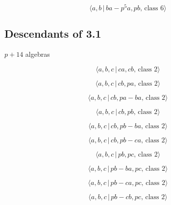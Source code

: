 \documentclass[10pt]{article}
\begin{document}
\begin{equation}
\langle a,b\,|\,ba-p^5a,pb,\,\text{class }6\rangle  \tag{7.659}
\end{equation}

\subsection{Descendants of 3.1}

$p+14$ algebras

\begin{equation}
\langle a,b,c\,|\,ca,cb,\,\text{class }2\rangle  \tag{7.660}
\end{equation}

\begin{equation}
\langle a,b,c\,|\,cb,pa,\,\text{class }2\rangle  \tag{7.661}
\end{equation}

\begin{equation}
\langle a,b,c\,|\,cb,pa-ba,\,\text{class }2\rangle  \tag{7.662}
\end{equation}

\begin{equation}
\langle a,b,c\,|\,cb,pb,\,\text{class }2\rangle  \tag{7.663}
\end{equation}

\begin{equation}
\langle a,b,c\,|\,cb,pb-ba,\,\text{class }2\rangle  \tag{7.664}
\end{equation}

\begin{equation}
\langle a,b,c\,|\,cb,pb-ca,\,\text{class }2\rangle  \tag{7.665}
\end{equation}

\begin{equation}
\langle a,b,c\,|\,pb,pc,\,\text{class }2\rangle  \tag{7.666}
\end{equation}

\begin{equation}
\langle a,b,c\,|\,pb-ba,pc,\,\text{class }2\rangle  \tag{7.667}
\end{equation}

\begin{equation}
\langle a,b,c\,|\,pb-ca,pc,\,\text{class }2\rangle  \tag{7.668}
\end{equation}

\begin{equation}
\langle a,b,c\,|\,pb-cb,pc,\,\text{class }2\rangle  \tag{7.669}
\end{equation}
\end{document}

